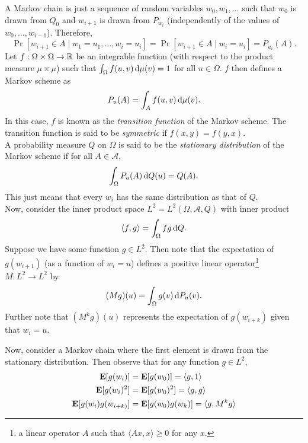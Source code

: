 A Markov chain is just a sequence of random variables $w_0,w_1,\ldots$ such that $w_0$ is drawn from $Q_0$ and $w_{i+1}$ is drawn from $P_{w_i}$ (independently of the values of $w_0,\ldots,w_{i-1}$). Therefore,
\[ \Pr[w_{i+1}\in A \mid w_1=u_1,\ldots,w_i=u_i] = \Pr[w_{i+1}\in A\mid w_i=u_i] = P_{u_i}(A). \]
Let $f:\Omega\times\Omega\to\mathbb{R}$ be an integrable function (with respect to the product measure $\mu\times\mu$) such that $\int_\Omega f(u,v)\operatorname{d}\!{\mu}(v)=1$ for all $u\in\Omega$. $f$ then defines a Markov scheme as
\[ P_u(A) = \int_A f(u,v)\operatorname{d}\!{\mu}(v). \]
In this case, $f$ is known as the \textit{transition function} of the Markov scheme. The transition function is said to be \textit{symmetric} if $f(x,y)=f(y,x)$.\\

A probability measure $Q$ on $\Omega$ is said to be the \textit{stationary distribution} of the Markov scheme if for all $A\in\mathcal{A}$,
\[ \int_{\Omega}P_u(A)\operatorname{d}\!{Q}(u) = Q(A). \]
This just means that every $w_i$ has the same distribution as that of $Q$.\\

Now, consider the inner product space $L^2 = L^2 (\Omega,\mathcal{A},Q)$ with inner product
\[ \langle f,g\rangle = \int_\Omega f g\operatorname{d}\!{Q}. \]
Suppose we have some function $g\in L^2$. Then note that the expectation of $g(w_{i+1})$ (as a function of $w_i = u$) defines a positive linear operator\footnote{a linear operator $A$ such that $\langle Ax,x\rangle\geq 0$ for any $x$.} $M:L^2\to L^2$ by
\[ (Mg)(u) = \int_\Omega g(v)\operatorname{d}\!{P_u}(v). \]
Further note that $(M^k g)(u)$ represents the expectation of $g(w_{i+k})$ given that $w_i=u$.

Now, consider a Markov chain where the first element is drawn from the stationary distribution. Then observe that for any function $g\in L^2$,
\begin{align*}
	\textbf{E}[g(w_i)] &= \textbf{E}[g(w_0)] = \langle g,1\rangle \\
	\textbf{E}[g(w_i)^2] &= \textbf{E}[g(w_0)^2] = \langle g,g\rangle \\
	\textbf{E}[g(w_i)g(w_{i+k)}] &= \textbf{E}[g(w_0)g(w_k)] = \langle g,M^k g\rangle
\end{align*}

